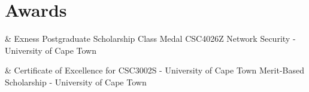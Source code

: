 \documentclass[10pt,a4paper]{article}
\begin{document}

\section{Awards}

\begin{EntriesTableDuration}
	  &
	Exness Postgraduate Scholarship \newline
	Class Medal CSC4026Z Network Security - University of Cape Town \newline
\end{EntriesTableDuration}

\begin{EntriesTableDuration}
	 &
	Certificate of Excellence for CSC3002S - University of Cape Town \newline
	Merit-Based Scholarship - University of Cape Town
\end{EntriesTableDuration}










\end{document}
